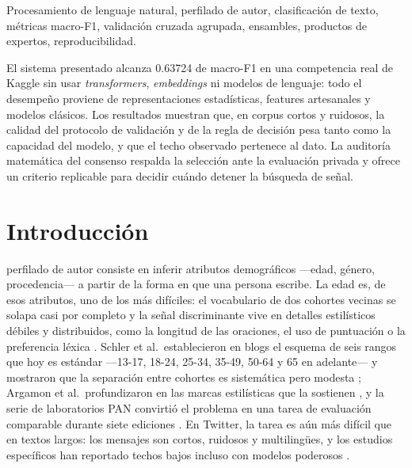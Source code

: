 \documentclass[journal]{IEEEtai}
\begin{document}
\begin{IEEEkeywords}
Procesamiento de lenguaje natural, perfilado de autor, clasificaci\'on de texto, m\'etricas macro-F1, validaci\'on cruzada agrupada, ensambles, productos de expertos, reproducibilidad.
\end{IEEEkeywords}

\begin{IEEEImpStatement}
El sistema presentado alcanza 0.63724 de macro-F1 en una competencia real de Kaggle sin usar \textit{transformers}, \textit{embeddings} ni modelos de lenguaje: todo el desempe\~no proviene de representaciones estad\'isticas, features artesanales y modelos cl\'asicos. Los resultados muestran que, en corpus cortos y ruidosos, la calidad del protocolo de validaci\'on y de la regla de decisi\'on pesa tanto como la capacidad del modelo, y que el techo observado pertenece al dato. La auditor\'ia matem\'atica del consenso respalda la selecci\'on ante la evaluaci\'on privada y ofrece un criterio replicable para decidir cu\'ando detener la b\'usqueda de se\~nal.
\end{IEEEImpStatement}

\section{Introducci\'on}

 perfilado de autor consiste en inferir atributos demogr\'aficos ---edad, g\'enero, procedencia--- a partir de la forma en que una persona escribe. La edad es, de esos atributos, uno de los m\'as dif\'iciles: el vocabulario de dos cohortes vecinas se solapa casi por completo y la se\~nal discriminante vive en detalles estil\'isticos d\'ebiles y distribuidos, como la longitud de las oraciones, el uso de puntuaci\'on o la preferencia l\'exica \cite{nguyen2013,nguyen2014}. Schler et al.\ establecieron en blogs el esquema de seis rangos que hoy es est\'andar ---13-17, 18-24, 25-34, 35-49, 50-64 y 65 en adelante--- y mostraron que la separaci\'on entre cohortes es sistem\'atica pero modesta \cite{schler2006}; Argamon et al.\ profundizaron en las marcas estil\'isticas que la sostienen \cite{argamon2007}, y la serie de laboratorios PAN convirti\'o el problema en una tarea de evaluaci\'on comparable durante siete ediciones \cite{rangel2013,rangel2015,rangel2017,rangel2019}. En Twitter, la tarea es a\'un m\'as dif\'icil que en textos largos: los mensajes son cortos, ruidosos y multiling\"ues, y los estudios espec\'ificos han reportado techos bajos incluso con modelos poderosos \cite{nguyen2011,sap2014,morganlopez2017}.
\end{document}
